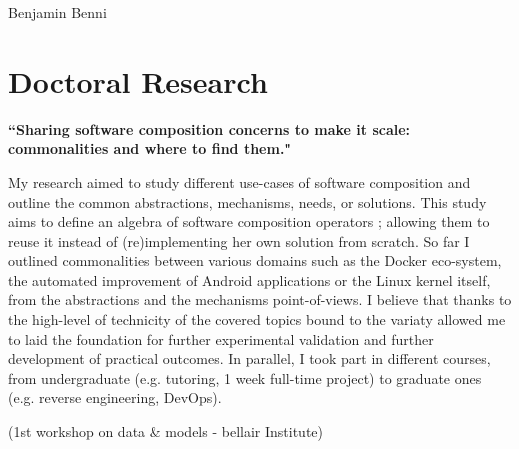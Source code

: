 \documentclass[10pt]{article} %
\begin{document}
\begin{paracol}{2} %


\parbox[top][0.08\textheight][c]{\linewidth}{ %
	\vspace{-0.02\textheight} %
	\centering %
	{\sffamily\Huge Benjamin Benni} %
}


\section{Doctoral Research}

{\raggedright\textbf{``Sharing software composition concerns to make it scale: commonalities and where to find them."}\\\medskip}

My research aimed to study different use-cases of software composition and outline the common abstractions, mechanisms, needs, or solutions.
This study aims to define an algebra of software composition operators ; allowing them to reuse it instead of (re)implementing her own solution from scratch. So far I outlined commonalities between various domains such as the Docker eco-system, the automated improvement of Android applications or the Linux kernel itself, from the abstractions and the mechanisms point-of-views.
I believe that thanks to the high-level of technicity of the covered topics bound to the variaty allowed me to laid the foundation for further experimental validation and further development of practical outcomes.
In parallel, I took part in different courses, from undergraduate (e.g. tutoring, 1 week full-time project) to graduate ones (e.g. reverse engineering, DevOps).


(1st workshop on data \& models - bellair Institute)


\end{paracol}
\end{document}
